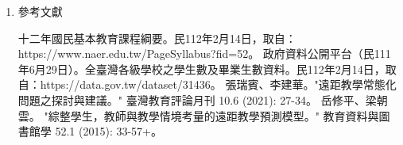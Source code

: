 \documentclass[12pt]{article}
\begin{document}
\begin{enumerate}
  \item 參考文獻
    \renewcommand{\section}[2]{}
    \begin{thebibliography}{99}
       十二年國民基本教育課程綱要。民112年2月14日，取自：https://www.naer.edu.tw/PageSyllabus?fid=52。
       政府資料公開平台（民111年6月29日）。全臺灣各級學校之學生數及畢業生數資料。民112年2月14日，取自：https://data.gov.tw/dataset/31436。
       張瑞賓、李建華。"遠距教學常態化問題之探討與建議。" 臺灣教育評論月刊 10.6 (2021): 27-34。
       岳修平、梁朝雲。 "綜整學生，教師與教學情境考量的遠距教學預測模型。" 教育資料與圖書館學 52.1 (2015): 33-57+。

\end{thebibliography}
\end{enumerate}
\end{document}
